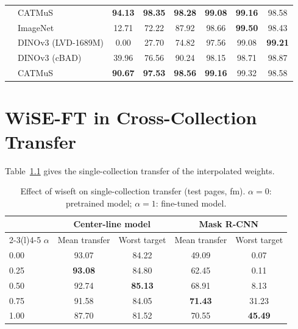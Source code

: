 \begin{table}[htbp]
\begin{tabular}{@{}llcccccc@{}}
         & CATMuS             & \textbf{94.13} & \textbf{98.35} & \textbf{98.28} & \textbf{99.08} & \textbf{99.16} & 98.58 \\
        \addlinespace[2pt]
        \multirow{4}{*}{ICA centroid} & ImageNet           & 12.71 & 72.22 & 87.92 & 98.66 & \textbf{99.50} & 98.43 \\
         & DINOv3 (LVD-1689M) & 0.00 & 27.70 & 74.82 & 97.56 & 99.08 & \textbf{99.21} \\
         & DINOv3 (cBAD)      & 39.96 & 76.56 & 90.24 & 98.15 & 98.71 & 98.87 \\
         & CATMuS             & \textbf{90.67} & \textbf{97.53} & \textbf{98.56} & \textbf{99.16} & 99.32 & 98.58 \\
        \bottomrule
    \end{tabular}
\end{table}

\FloatBarrier

\chapter{WiSE-FT in Cross-Collection Transfer}
\label{app:rq3-extra}\label{app:rq3-wiseft}

Table~\ref{tab:rq3-wiseft} gives the single-collection transfer of the interpolated weights.

\begin{table}[htbp]
    \centering
    \caption{Effect of \gls{wiseft} on single-collection transfer (test pages, \gls{fm}). \(\alpha=0\): pretrained model; \(\alpha=1\): fine-tuned model.}
    \label{tab:rq3-center-line-components}\label{tab:rq3-wiseft}
    \footnotesize
    \begin{tabular}{@{}lcccc@{}}
        \toprule
        & \multicolumn{2}{c}{Center-line model} & \multicolumn{2}{c}{Mask R-CNN} \\
        \cmidrule(lr){2-3}\cmidrule(l){4-5}
        \(\alpha\) & Mean transfer & Worst target & Mean transfer & Worst target \\
        \midrule
        0.00 & 93.07 & 84.22 & 49.09 & 0.07 \\
        0.25 & \textbf{93.08} & 84.80 & 62.45 & 0.11 \\
        0.50 & 92.74 & \textbf{85.13} & 68.91 & 8.13 \\
        0.75 & 91.58 & 84.05 & \textbf{71.43} & 31.23 \\
        1.00 & 87.70 & 81.52 & 70.55 & \textbf{45.49} \\
        \bottomrule
    \end{tabular}
\end{table}

